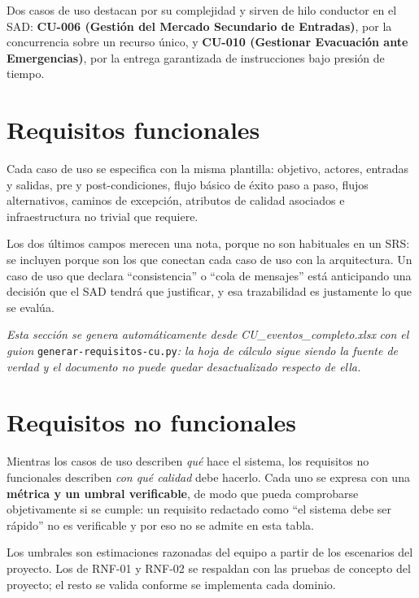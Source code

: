 \documentclass[11pt,a4paper]{article}
\begin{document}
Dos casos de uso destacan por su complejidad y sirven de hilo conductor en el SAD:
\textbf{CU-006 (Gestión del Mercado Secundario de Entradas)}, por la concurrencia sobre un recurso
único, y \textbf{CU-010 (Gestionar Evacuación ante Emergencias)}, por la entrega garantizada de
instrucciones bajo presión de tiempo.

\section{Requisitos funcionales}
\label{sec:funcionales}

Cada caso de uso se especifica con la misma plantilla: objetivo, actores, entradas y salidas,
pre y post-condiciones, flujo básico de éxito paso a paso, flujos alternativos, caminos de
excepción, atributos de calidad asociados e infraestructura no trivial que requiere.

Los dos últimos campos merecen una nota, porque no son habituales en un SRS: se incluyen porque
son los que conectan cada caso de uso con la arquitectura. Un caso de uso que declara
``consistencia'' o ``cola de mensajes'' está anticipando una decisión que el SAD tendrá que
justificar, y esa trazabilidad es justamente lo que se evalúa.

\textit{Esta sección se genera automáticamente desde} \textit{CU\_eventos\_completo.xlsx}
\textit{con el guion} \texttt{generar-requisitos-cu.py}\textit{: la hoja de cálculo sigue siendo la
fuente de verdad y el documento no puede quedar desactualizado respecto de ella.}



\section{Requisitos no funcionales}
\label{sec:nofuncionales}

Mientras los casos de uso describen \textit{qué} hace el sistema, los requisitos no funcionales
describen \textit{con qué calidad} debe hacerlo. Cada uno se expresa con una \textbf{métrica y un
umbral verificable}, de modo que pueda comprobarse objetivamente si se cumple: un requisito
redactado como ``el sistema debe ser rápido'' no es verificable y por eso no se admite en esta
tabla.

Los umbrales son estimaciones razonadas del equipo a partir de los escenarios del proyecto. Los de
RNF-01 y RNF-02 se respaldan con las pruebas de concepto del proyecto; el resto se valida conforme
se implementa cada dominio.
\end{document}
